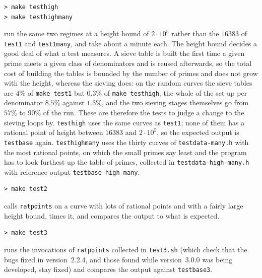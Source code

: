 \documentclass[12pt,a4paper,oneside]{amsart}
\begin{document}
\begin{verbatim}
> make testhigh
> make testhighmany
\end{verbatim}
run the same two regimes at a height bound of $2\cdot10^5$ rather than the
$16383$ of \texttt{test1} and \texttt{test1many}, and take about a minute
each. The height bound decides a good deal of what a test measures. A sieve table
is built the first time a given prime meets a given class of denominators and
is reused afterwards, so the total cost of building the tables is bounded by
the number of primes and does not grow with the height, whereas the sieving
does: on the random curves the sieve tables are $4\%$ of \texttt{make test1}
but $0.3\%$ of \texttt{make testhigh}, the whole of the set-up per
denominator $8.5\%$ against $1.3\%$, and the two sieving stages themselves go
from $57\%$ to $90\%$ of the run. These are therefore the tests to judge a
change to the sieving loops by. \texttt{testhigh} uses the same curves as
\texttt{test1}; none of them has a rational point of height between $16383$
and $2\cdot10^5$, so the expected output is \texttt{testbase} again.
\texttt{testhighmany} uses the thirty
curves of \texttt{testdata-many.h} with the most rational points, on which
the small primes say least and the program has to look furthest up the table
of primes, collected in \texttt{testdata-high-many.h} with reference output
\texttt{testbase-high-many}.

\begin{verbatim}
> make test2
\end{verbatim}
calls \texttt{ratpoints} on a curve with lots of rational points and with
a fairly large height bound, times it, and compares the output to what is
expected.

\begin{verbatim}
> make test3
\end{verbatim}
runs the invocations of \texttt{ratpoints} collected in \texttt{test3.sh}
(which check that the bugs fixed in version~2.2.4, and those found while
version~3.0.0 was being developed, stay fixed) and
compares the output against \texttt{testbase3}.
\end{document}
